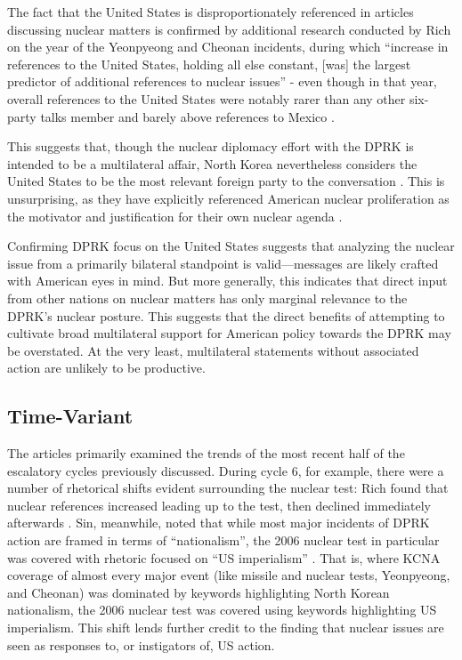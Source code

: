 The fact that the United States is disproportionately referenced in articles discussing nuclear matters is confirmed by additional research conducted by Rich on the year of the Yeonpyeong and Cheonan incidents, during which ``increase in references to the United States, holding all else constant, [was] the largest predictor of additional references to nuclear issues'' - even though in that year, overall references to the United States were notably rarer than any other six-party talks member and barely above references to Mexico \cite{rich12}.

This suggests that, though the nuclear diplomacy effort with the DPRK is intended to be a multilateral affair, North Korea nevertheless considers the United States to be the most relevant foreign party to the conversation \cite{rich14}. This is unsurprising, as they have explicitly referenced American nuclear proliferation as the motivator and justification for their own nuclear agenda \cite{kcna, kcna3, kcna4}.

Confirming DPRK focus on the United States suggests that analyzing the nuclear issue from a primarily bilateral standpoint is valid---messages are likely crafted with American eyes in mind. But more generally, this indicates that direct input from other nations on nuclear matters has only marginal relevance to the DPRK's nuclear posture. This suggests that the direct benefits of attempting to cultivate broad multilateral support for American policy towards the DPRK may be overstated. At the very least, multilateral statements without associated action are unlikely to be productive.

\subsection{Time-Variant}

The articles primarily examined the trends of the most recent half of the escalatory cycles previously discussed. During cycle 6, for example, there were a number of rhetorical shifts evident surrounding the nuclear test: Rich found that nuclear references increased leading up to the test, then declined immediately afterwards \cite{rich14}. Sin, meanwhile, noted that while most major incidents of DPRK action are framed in terms of ``nationalism'', the 2006 nuclear test in particular was covered with rhetoric focused on ``US imperialism'' \cite{sin}. That is, where KCNA coverage of almost every major event (like missile and nuclear tests, Yeonpyeong, and Cheonan) was dominated by keywords highlighting North Korean nationalism, the 2006 nuclear test was covered using keywords highlighting US imperialism. This shift lends further credit to the finding that nuclear issues are seen as responses to, or instigators of, US action.

